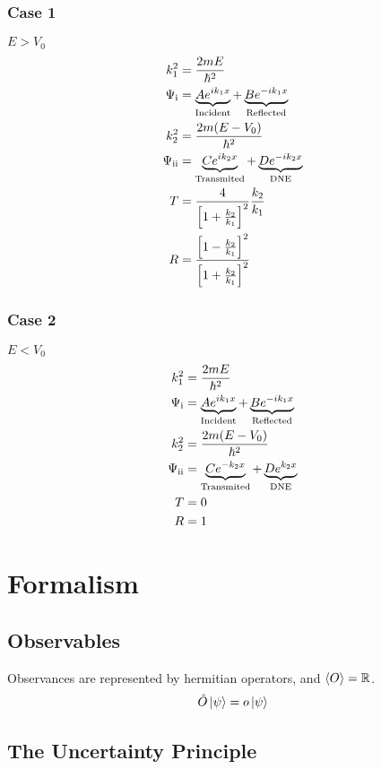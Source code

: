 \documentclass[8pt]{amsart}
\newcommand{\Op}{\hat{O}}
\newcommand{\RN}[1]{%
  \textup{\uppercase\expandafter{\romannumeral#1}}%
}
\newcommand{\R}{\mathbb{R}}
\begin{document}
\begin{multicols}{3}
\subsubsection{Case 1}%
\label{ssub:case_1}
$E>V_0$
\begin{align*}
  k_1^2&=\frac{2mE}{\hbar^2}\\
  \Psi_\RN{1}&=\underbrace{Ae^{ik_1x}}_\text{Incident}+\underbrace{Be^{-ik_1x}}_\text{Reflected}\\
  k_2^2&=\frac{2m(E-V_0)}{\hbar^2}\\
  \Psi_{\RN{2}}&=\underbrace{Ce^{ik_2x}}_\text{Transmited}+\underbrace{De^{-ik_2x}}_\text{DNE}\\
  T&=\frac{4}{\left[1+\frac{k_2}{k_1}\right]^2}\frac{k_2}{k_1}\\
  R&=\frac{\left[1-\frac{k_2}{k_1}\right]^2}{\left[1+\frac{k_2}{k_1}\right]^2}
\end{align*}

\subsubsection{Case 2}%
\label{ssub:case_2}
$E<V_0$
\begin{align*}
  k_1^2&=\frac{2mE}{\hbar^2}\\
  \Psi_\RN{1}&=\underbrace{Ae^{ik_1x}}_\text{Incident}+\underbrace{Be^{-ik_1x}}_\text{Reflected}\\
  k_2^2&=\frac{2m(E-V_0)}{\hbar^2}\\
  \Psi_{\RN{2}}&=\underbrace{Ce^{-k_2x}}_\text{Transmited}+\underbrace{De^{k_2x}}_\text{DNE}\\
  T&=0\\
  R&=1
\end{align*}


\section{Formalism}%
\label{sec:formalism}

\subsection{Observables}%
\label{sub:observables}

Observances are represented by hermitian operators, and $\expval{O}=\R$.
\begin{align*}
  \Op\ket{\psi}=o\ket{\psi}
\end{align*}

\subsection{The Uncertainty Principle}%
\label{sub:the_uncertainty_principle}


\end{multicols}
\end{document}
